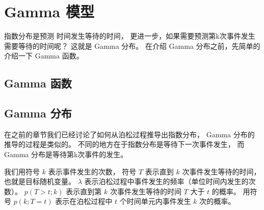 \documentclass[letterpaper,10pt,english]{sphinxmanual}
\begin{document}
\chapter{Gamma 模型}
\label{\detokenize{gamma_u6a21_u578b/content:gamma}}\label{\detokenize{gamma_u6a21_u578b/content::doc}}
指数分布是预测  时间发生等待的时间，
更进一步，如果需要预测第k次事件发生需要等待的时间呢？
这就是 Gamma 分布。
在介绍 Gamma 分布之前，先简单的介绍一下 Gamma 函数。


\section{Gamma 函数}
\label{\detokenize{gamma_u6a21_u578b/content:id1}}


\section{Gamma 分布}
\label{\detokenize{gamma_u6a21_u578b/content:id2}}
在之前的章节我们已经讨论了如何从泊松过程推导出指数分布，
Gamma 分布的推导的过程是类似的。
不同的地方在于指数分布是等待下一次事件发生，
而 Gamma 分布是等待第k次事件的发生。

我们用符号 \(k\) 表示事件发生的次数，
符号 \(T\) 表示直到 \(k\) 次事件发生等待的时间，也就是目标随机变量。
\(\lambda\) 表示泊松过程中事件发生的频率（单位时间内发生的次数）。
\(p(T>t;k)\) 表示直到第 \(k\) 次事件发生等待的时间 \(T\) 大于 \(t\) 的概率。
用符号 \(p(k;T=t)\) 表示在泊松过程中 \(t\) 个时间单元内事件发生 \(k\) 次的概率。
\end{document}
